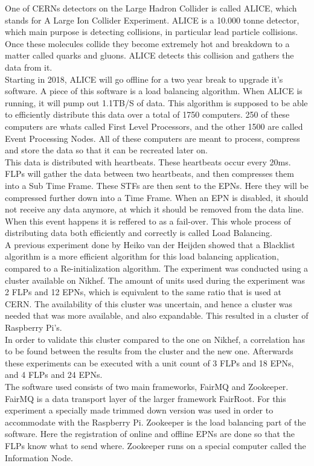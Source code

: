 One of CERNs detectors on the Large Hadron Collider is called ALICE, which stands for A Large Ion Collider Experiment. ALICE is a 10.000 tonne detector, which main purpose is detecting collisions, in particular lead particle collisions. Once these molecules collide they become extremely hot and breakdown to a matter called quarks and gluons. ALICE detects this collision and gathers the data from it. \\
Starting in 2018, ALICE will go offline for a two year break to upgrade it's software. A piece of this software is a load balancing algorithm. When ALICE is running, it will pump out 1.1TB/S of data. This algorithm is supposed to be able to efficiently distribute this data over a total of 1750 computers. 250 of these computers are whats called First Level Processors, and the other 1500 are called Event Processing Nodes. All of these computers are meant to process, compress and store the data so that it can be recreated later on. \\
This data is distributed with heartbeats. These heartbeats occur every 20ms. FLPs will gather the data between two heartbeats, and then compresses them into a Sub Time Frame. These STFs are then sent to the EPNs. Here they will be compressed further down into a Time Frame. When an EPN is disabled, it should not receive any data anymore, at which it should be removed from the data line. When this event happens it is reffered to as a fail-over. This whole process of distributing data both efficiently and correctly is called Load Balancing. \\
A previous experiment done by Heiko van der Heijden showed that a Blacklist algorithm is a more efficient algorithm for this load balancing application, compared to a Re-initialization algorithm. The experiment was conducted using a cluster available on Nikhef. The amount of units used during the experiment was 2 FLPs and 12 EPNs, which is equivalent to the same ratio that is used at CERN. The availability of this cluster was uncertain, and hence a cluster was needed that was more available, and also expandable. This resulted in a cluster of Raspberry Pi's. \\
In order to validate this cluster compared to the one on Nikhef, a correlation has to be found between the results from the cluster and the new one. Afterwards these experiments can be executed with a unit count of 3 FLPs and 18 EPNs, and 4 FLPs and 24 EPNs. \\
The software used consists of two main frameworks, FairMQ and Zookeeper. FairMQ is a data transport layer of the larger framework FairRoot. For this experiment a specially made trimmed down version was used in order to accommodate with the Raspberry Pi. Zookeeper is the load balancing part of the software. Here the registration of online and offline EPNs are done so that the FLPs know what to send where. Zookeeper runs on a special computer called the Information Node. \\
